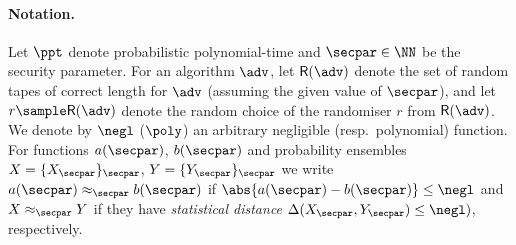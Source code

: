 


\paragraph{Notation.} Let $\ppt$ denote probabilistic polynomial-time and $\secpar \in \NN$ be the
security parameter. %
For an algorithm $\adv$, 
let
$\RND{\adv}$ denote the set of random tapes of correct length for $\adv$
(assuming the given value of $\secpar$), and let $r \sample \RND{\adv}$ denote
the random choice of the randomiser $r$ from $\RND{\adv}$. We denote by $\negl$
($\poly$) an arbitrary negligible (resp.~polynomial) function.
%
For functions $a(\secpar)$, $b(\secpar)$ and probability ensembles $X = \smallset{X_\secpar}_\secpar$,
$Y = \smallset{Y_\secpar}_\secpar$ we
write $a(\secpar) \approx_\secpar b(\secpar)$ if
$\abs{a(\secpar) - b(\secpar)} \leq \negl$ and $X \approx_\secpar Y$ if they have \emph{statistical distance} $\SD(X_\secpar, Y_\secpar) \leq \negl )$, respectively. \medskip




